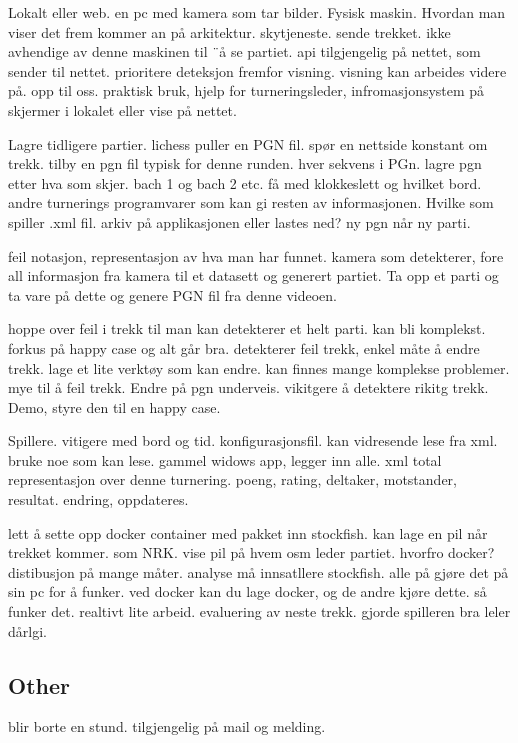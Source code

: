 Lokalt eller web. en pc med kamera som tar bilder. Fysisk maskin. Hvordan man viser det frem kommer an på arkitektur.  skytjeneste. sende trekket. ikke avhendige av denne maskinen til ¨å se partiet. api tilgjengelig på nettet, som sender til nettet. prioritere deteksjon fremfor visning. visning kan arbeides videre på. opp til oss. praktisk bruk, hjelp for turneringsleder, infromasjonsystem på skjermer i lokalet eller vise på nettet. 

Lagre tidligere partier. lichess puller en PGN fil. spør en nettside konstant om trekk. tilby en pgn fil  typisk for denne runden. hver sekvens i PGn. lagre pgn etter hva som skjer. bach 1 og bach 2 etc. få med klokkeslett og hvilket bord. andre turnerings programvarer som kan gi resten av informasjonen. Hvilke som spiller .xml fil. arkiv på applikasjonen eller lastes ned? ny pgn når ny parti. 

feil notasjon, representasjon av hva man har funnet. kamera som detekterer, fore all informasjon fra kamera til et datasett og generert partiet. Ta opp et parti og ta vare på dette og genere PGN fil fra denne videoen. 

hoppe over feil i trekk til man kan detekterer et helt parti. kan bli komplekst. forkus på happy case og alt går bra. detekterer feil trekk, enkel måte å endre trekk. lage et lite verktøy som kan endre. kan finnes mange komplekse problemer. mye til å feil trekk. Endre på pgn underveis. vikitgere å detektere rikitg trekk. Demo, styre den til en happy case. 

Spillere. vitigere med bord og tid. konfigurasjonsfil. kan vidresende lese fra xml. bruke noe som kan lese. gammel widows app, legger inn alle. xml total representasjon over denne turnering. poeng, rating, deltaker, motstander, resultat. endring, oppdateres. 

lett å sette opp docker container med pakket inn stockfish. kan lage en pil når trekket kommer. som NRK. vise pil på hvem osm leder partiet. hvorfro docker? distibusjon på mange måter. analyse må innsatllere stockfish. alle på gjøre det på sin pc for å funker. ved docker kan du lage docker, og de andre kjøre dette. så funker det. realtivt lite arbeid. evaluering av neste trekk. gjorde spilleren bra leler dårlgi. 


\subsection{Other}
blir borte en stund. tilgjengelig på mail og melding.
